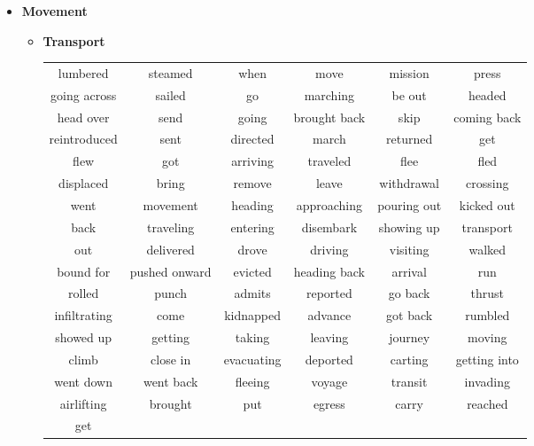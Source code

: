 \documentclass[11pt, oneside]{article}   	%
\begin{document}
\begin{itemize}
\clearpage
\item[] \textbf{Movement} 
	\vspace*{-0.2cm}
	\begin{itemize}
	\item[] \textbf{Transport} \\
		 \begin{tabular}{ c c c c c c }
		 lumbered & steamed & when & move & mission & press\\going across & sailed & go & marching & be out & headed\\head over & send & going & brought back & skip & coming back\\reintroduced & sent & directed & march & returned & get\\flew & got & arriving & traveled & flee & fled\\displaced & bring & remove & leave & withdrawal & crossing\\went & movement & heading & approaching & pouring out & kicked out\\back & traveling & entering & disembark & showing up & transport\\out & delivered & drove & driving & visiting & walked\\bound for & pushed onward & evicted & heading back & arrival & run\\rolled & punch & admits & reported & go back & thrust\\infiltrating & come & kidnapped & advance & got back & rumbled\\showed up & getting & taking & leaving & journey & moving\\climb & close
in & evacuating & deported & carting & getting into\\went down & went back & fleeing & voyage & transit & invading\\airlifting & brought & put & egress & carry & reached\\get

\end{tabular}
\end{itemize}
\end{itemize}
\end{document}
